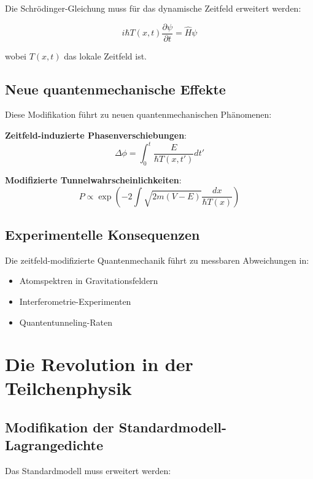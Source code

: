 \documentclass[12pt,a4paper]{report}
\begin{document}
	Die Schrödinger-Gleichung muss für das dynamische Zeitfeld erweitert werden:
	
	\begin{equation}
		i\hbar T(x,t) \frac{\partial\psi}{\partial t} = \hat{H}\psi
	\end{equation}
	
	wobei $T(x,t)$ das lokale Zeitfeld ist.
	
	\subsection{Neue quantenmechanische Effekte}
	
	Diese Modifikation führt zu neuen quantenmechanischen Phänomenen:
	
	\textbf{Zeitfeld-induzierte Phasenverschiebungen}:
	\begin{equation}
		\Delta\phi = \int_0^t \frac{E}{\hbar T(x,t')} dt'
	\end{equation}
	
	\textbf{Modifizierte Tunnelwahrscheinlichkeiten}:
	\begin{equation}
		P \propto \exp\left(-2\int \sqrt{2m(V-E)} \frac{dx}{\hbar T(x)}\right)
	\end{equation}
	
	\subsection{Experimentelle Konsequenzen}
	
	Die zeitfeld-modifizierte Quantenmechanik führt zu messbaren Abweichungen in:
	\begin{itemize}
		\item Atomspektren in Gravitationsfeldern
		\item Interferometrie-Experimenten
		\item Quantentunneling-Raten
	\end{itemize}
	
	\section{Die Revolution in der Teilchenphysik}
	
	\subsection{Modifikation der Standardmodell-Lagrangedichte}
	
	Das Standardmodell muss erweitert werden:
	
\end{document}
